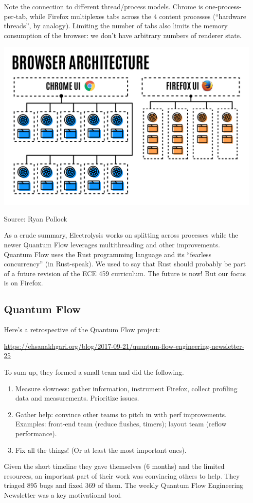 Note the connection to different thread/process models.
Chrome is one-process-per-tab, while Firefox multiplexes tabs across
the 4 content processes (``hardware threads'', by analogy). Limiting
the number of tabs also limits the memory consumption of the browser:
we don't have arbitrary numbers of renderer state.

\begin{center}
\includegraphics[width=.9\textwidth]{images/L19-chrome-vs-firefox.png}
\end{center}
Source: Ryan Pollock~\cite{goldilocks}

As a crude summary, Electrolysis works on splitting across processes
while the newer Quantum Flow leverages multithreading and other
improvements.  Quantum Flow uses the Rust programming language and its
``fearless concurrency'' (in Rust-speak). We used to say that Rust should probably be part of a future revision of the ECE 459 curriculum. The future is now! But our focus is on Firefox.

\subsection*{Quantum Flow}
Here's a retrospective of the Quantum Flow project:
\begin{center}
\url{https://ehsanakhgari.org/blog/2017-09-21/quantum-flow-engineering-newsletter-25}
\end{center}

To sum up, they formed a small team and did the following.
\begin{enumerate}[noitemsep]
\item Measure slowness: gather information, instrument Firefox, collect profiling data and measurements. Prioritize issues.
\item Gather help: convince other teams to pitch in with perf improvements. Examples: front-end team (reduce flushes, timers); layout team (reflow performance).
\item Fix all the things! (Or at least the most important ones).
\end{enumerate}
Given the short timeline they gave themselves (6 months) and the limited resources, an important part of their work was convincing others to help.
They triaged 895 bugs and fixed 369 of them. The weekly Quantum Flow Engineering Newsletter was a key motivational tool.

